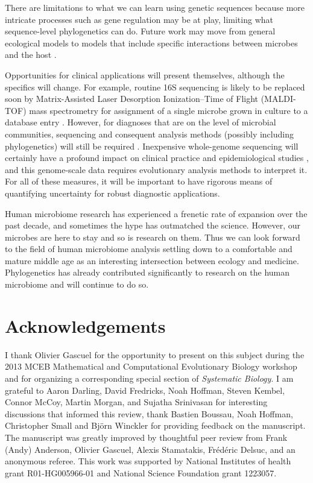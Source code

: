 \documentclass{amsart}
\begin{document}
There are limitations to what we can learn using genetic sequences because more intricate processes such as gene regulation may be at play, limiting what sequence-level phylogenetics can do.
Future work may move from general ecological models to models that include specific interactions between microbes and the host \citep[reviewed in][]{hooper2012interactions}.

Opportunities for clinical applications will present themselves, although the specifics will change.
For example, routine 16S sequencing is likely to be replaced soon by Matrix-Assisted Laser Desorption Ionization--Time of Flight (MALDI-TOF) mass spectrometry for assignment of a single microbe grown in culture to a database entry \citep{clark2013matrix}.
However, for diagnoses that are on the level of microbial communities, sequencing and consequent analysis methods (possibly including phylogenetics) will still be required \citep[reviewed in][]{Rogers2013271}.
Inexpensive whole-genome sequencing will certainly have a profound impact on clinical practice and epidemiological studies \citep{didelot2012transforming}, and this genome-scale data requires evolutionary analysis methods to interpret it.
For all of these measures, it will be important to have rigorous means of quantifying uncertainty for robust diagnostic applications.

Human microbiome research has experienced a frenetic rate of expansion over the past decade, and sometimes the hype has outmatched the science.
However, our microbes are here to stay and so is research on them.
Thus we can look forward to the field of human microbiome analysis settling down to a comfortable and mature middle age as an interesting intersection between ecology and medicine.
Phylogenetics has already contributed significantly to research on the human microbiome and will continue to do so.



\section{Acknowledgements}
I thank Olivier Gascuel for the opportunity to present on this subject during the 2013 MCEB Mathematical and Computational Evolutionary Biology workshop and for organizing a corresponding special section of \textit{Systematic Biology}.
I am grateful to Aaron Darling, David Fredricks, Noah Hoffman, Steven Kembel, Connor McCoy, Martin Morgan, and Sujatha Srinivasan for interesting discussions that informed this review, thank Bastien Boussau, Noah Hoffman, Christopher Small and Bj\"orn Winckler for providing feedback on the manuscript.
The manuscript was greatly improved by thoughtful peer review from Frank (Andy) Anderson, Olivier Gascuel, Alexis Stamatakis, Frédéric Delsuc, and an anonymous referee.
This work was supported by National Institutes of health grant R01-HG005966-01 and National Science Foundation grant 1223057.
\end{document}
